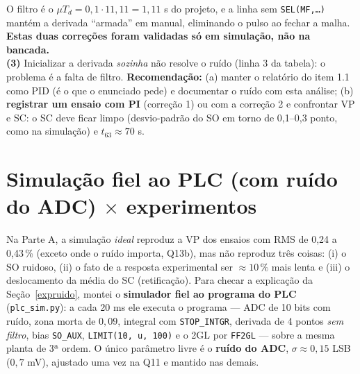 O filtro é o $\mu T_d=0{,}1\cdot11{,}11=1{,}11$ s do projeto, e a linha sem \texttt{SEL(MF,\ldots)} mantém a derivada ``armada'' em manual, eliminando o pulso ao fechar a malha. \textbf{Estas duas correções foram validadas só em simulação, não na bancada.}\\
\textbf{(3)} Inicializar a derivada \emph{sozinha} não resolve o ruído (linha 3 da tabela): o problema é a falta de filtro.
\textbf{Recomendação:} (a) manter o relatório do item 1.1 como PID (é o que o enunciado pede) e documentar o ruído com esta análise; (b) \textbf{registrar um ensaio com PI} (correção 1) ou com a correção 2 e confrontar VP e SC: o SC deve ficar limpo (desvio-padrão do SO em torno de 0,1--0,3 ponto, como na simulação) e $t_{63}\approx70$ s.

\section{Simulação fiel ao PLC (com ruído do ADC) $\times$ experimentos}\label{simplc}
Na Parte A, a simulação \emph{ideal} reproduz a VP dos ensaios com RMS de 0,24 a 0,43\,\% (exceto onde o ruído importa, Q13b), mas não reproduz três coisas: (i) o SO ruidoso, (ii) o fato de a resposta experimental ser $\approx10\,\%$ mais lenta e (iii) o deslocamento da média do SC (retificação). Para checar a explicação da Seção~\ref{expruido}, montei o \textbf{simulador fiel ao programa do PLC} (\texttt{plc\_sim.py}): a cada 20 ms ele executa o programa --- ADC de 10 bits com ruído, zona morta de $0{,}09$, integral com \texttt{STOP\_INTGR}, derivada de 4 pontos \emph{sem filtro}, bias \texttt{SO\_AUX}, \texttt{LIMIT(10,\,u,\,100)} e o 2GL por \texttt{FF2GL} --- sobre a mesma planta de 3ª ordem. O único parâmetro livre é o \textbf{ruído do ADC}, $\sigma\approx0{,}15$ LSB ($0{,}7$ mV), ajustado uma vez na Q11 e mantido nas demais.

